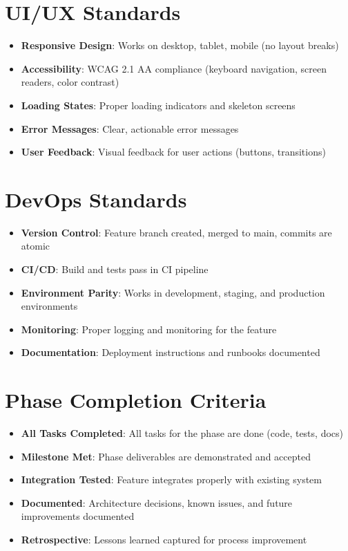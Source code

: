 \documentclass[12pt,oneside]{report}
\begin{document}
\section{UI/UX Standards}

\begin{itemize}
    \item \textbf{Responsive Design}: Works on desktop, tablet, mobile (no layout breaks)
    \item \textbf{Accessibility}: WCAG 2.1 AA compliance (keyboard navigation, screen readers, color contrast)
    \item \textbf{Loading States}: Proper loading indicators and skeleton screens
    \item \textbf{Error Messages}: Clear, actionable error messages
    \item \textbf{User Feedback}: Visual feedback for user actions (buttons, transitions)
\end{itemize}

\section{DevOps Standards}

\begin{itemize}
    \item \textbf{Version Control}: Feature branch created, merged to main, commits are atomic
    \item \textbf{CI/CD}: Build and tests pass in CI pipeline
    \item \textbf{Environment Parity}: Works in development, staging, and production environments
    \item \textbf{Monitoring}: Proper logging and monitoring for the feature
    \item \textbf{Documentation}: Deployment instructions and runbooks documented
\end{itemize}

\section{Phase Completion Criteria}

\begin{itemize}
    \item \textbf{All Tasks Completed}: All tasks for the phase are done (code, tests, docs)
    \item \textbf{Milestone Met}: Phase deliverables are demonstrated and accepted
    \item \textbf{Integration Tested}: Feature integrates properly with existing system
    \item \textbf{Documented}: Architecture decisions, known issues, and future improvements documented
    \item \textbf{Retrospective}: Lessons learned captured for process improvement
\end{itemize}
\end{document}
